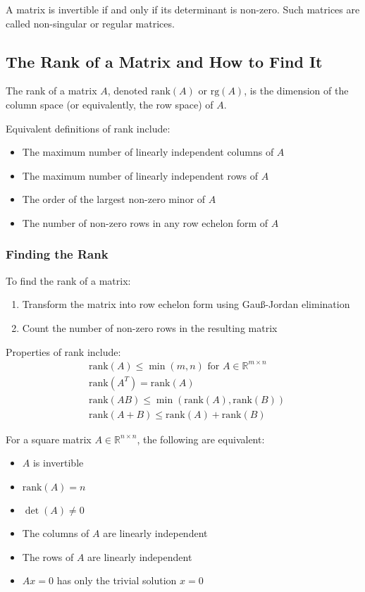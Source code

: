 A matrix is invertible if and only if its determinant is non-zero. Such matrices are called non-singular or regular matrices.

\subsection{The Rank of a Matrix and How to Find It}

The rank of a matrix \(A\), denoted \(\text{rank}(A)\) or \(\text{rg}(A)\), is the dimension of the column space (or equivalently, the row space) of \(A\).

Equivalent definitions of rank include:
\begin{itemize}[label=\(-\)]
    \item The maximum number of linearly independent columns of \(A\)
    \item The maximum number of linearly independent rows of \(A\)
    \item The order of the largest non-zero minor of \(A\)
    \item The number of non-zero rows in any row echelon form of \(A\)
\end{itemize}

\subsubsection{Finding the Rank}
To find the rank of a matrix:
\begin{enumerate}
    \item Transform the matrix into row echelon form using Gauß-Jordan elimination
    \item Count the number of non-zero rows in the resulting matrix
\end{enumerate}

Properties of rank include:
\begin{align*}
&\text{rank}(A) \leq \min(m,n) \text{ for } A \in \mathbb{R}^{m \times n} \\
&\text{rank}(A^T) = \text{rank}(A) \\
&\text{rank}(AB) \leq \min(\text{rank}(A), \text{rank}(B)) \\
&\text{rank}(A+B) \leq \text{rank}(A) + \text{rank}(B)
\end{align*}

For a square matrix \(A \in \mathbb{R}^{n \times n}\), the following are equivalent:
\begin{itemize}[label=\(-\)]
    \item \(A\) is invertible
    \item \(\text{rank}(A) = n\)
    \item \(\det(A) \neq 0\)
    \item The columns of \(A\) are linearly independent
    \item The rows of \(A\) are linearly independent
    \item \(Ax = 0\) has only the trivial solution \(x = 0\)
\end{itemize}

